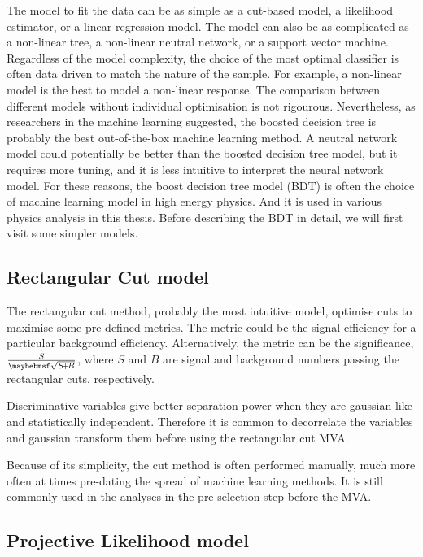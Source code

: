 The model to fit the data can be as simple as a cut-based model, a likelihood estimator, or a linear regression model. The model can also be as complicated as a non-linear tree, a non-linear neutral network, or a support vector machine. Regardless of the model complexity, the choice of the most optimal classifier is often data driven to match the nature of the sample. For example, a non-linear model is the best to model a non-linear response. The  comparison between different models without individual optimisation is not rigourous.  Nevertheless, as researchers in the machine learning suggested, the boosted decision tree is probably the best out-of-the-box machine learning method. A neutral network model could potentially be better than the boosted decision tree model, but it requires more tuning, and it is less intuitive to interpret the neural network model. For these reasons, the boost decision tree model (BDT) is often the choice of machine learning model in high energy physics. And it is used in various physics analysis in this thesis. Before describing the BDT in detail, we will first visit some simpler models.


\subsection{Rectangular Cut model}

The rectangular cut method, probably the most intuitive model, optimise cuts to maximise some pre-defined metrics. The metric could be the signal efficiency for a particular background efficiency. Alternatively, the metric can be the significance, $\frac{S}{\rootOf{S\!+\!B}}$, where $S$ and $B$ are signal and background numbers passing the rectangular cuts, respectively.

Discriminative variables give better separation power when they are gaussian-like and statistically independent. Therefore it is common to decorrelate  the variables and gaussian transform them before using the rectangular cut MVA.

Because of its simplicity, the cut method is often performed manually, much more often at times pre-dating the spread of machine learning methods. It is still commonly used in the analyses in  the pre-selection step before the MVA.

\subsection{Projective Likelihood model}
\label{sec:pandoraLikelihood}


